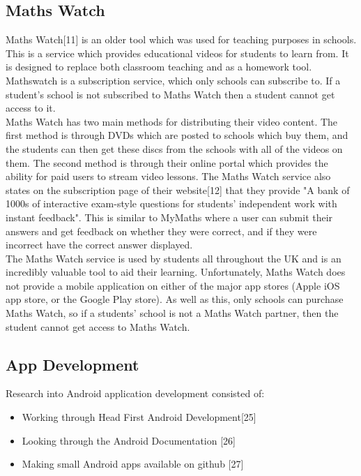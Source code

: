 \documentclass{article}
\begin{document}
\subsection{Maths Watch}

Maths Watch[11] is an older tool which was used for teaching purposes in schools. This is a service which provides educational videos for students to learn from. It is designed to replace both classroom teaching and as a homework tool. Mathswatch is a subscription service, which only schools can subscribe to. If a student's school is not subscribed to Maths Watch then a student cannot get access to it. \\

Maths Watch has two main methods for distributing their video content. The first method is through DVDs which are posted to schools which buy them, and the students can then get these discs from the schools with all of the videos on them. The second method is through their online portal which provides the ability for paid users to stream video lessons. The Maths Watch service also states on the subscription page of their website[12] that they provide "A bank of 1000s of interactive exam-style questions for students' independent work with instant feedback". This is similar to MyMaths where a user can submit their answers and get feedback on whether they were correct, and if they were incorrect have the correct answer displayed. \\

The Maths Watch service is used by students all throughout the UK and is an incredibly valuable tool to aid their learning. Unfortunately, Maths Watch does not provide a mobile application on either of the major app stores (Apple iOS app store, or the Google Play store). As well as this, only schools can purchase Maths Watch, so if a students' school is not a Maths Watch partner, then the student cannot get access to Maths Watch. \\

\subsection{App Development}

Research into Android application development consisted of: 

\begin{itemize}
	\item Working through Head First Android Development[25]
	\item Looking through the Android Documentation [26]
	\item Making small Android apps available on github [27]
\end{itemize}
\end{document}
